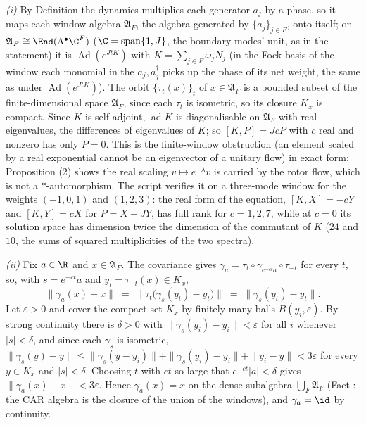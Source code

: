 \emph{(i)} By Definition  the dynamics multiplies each generator $a_{j}$ by a phase, so it maps each window algebra $\mathfrak{A}_{F}$, the algebra generated by $\{a_{j}\}_{j \in F}$, onto itself; on $\mathfrak{A}_{F} \cong \End(\Lambda^{\bullet}\C^{F})$ ($\C = \mathrm{span}\{1, J\}$, the boundary modes' unit, as in the statement) it is $\operatorname{Ad}(e^{JtK})$ with $K = \sum_{j \in F}\omega_{j}N_{j}$ (in the Fock basis of the window each monomial in the $a_{j}, a_{j}^{\dagger}$ picks up the phase of its net weight, the same as under $\operatorname{Ad}(e^{JtK})$). The orbit $\{\tau_{t}(x)\}_{t}$ of $x \in \mathfrak{A}_{F}$ is a bounded subset of the finite-dimensional space $\mathfrak{A}_{F}$, since each $\tau_{t}$ is isometric, so its closure $K_{x}$ is compact. Since $K$ is self-adjoint, $\operatorname{ad}K$ is diagonalisable on $\mathfrak{A}_{F}$ with real eigenvalues, the differences of eigenvalues of $K$; so $[K, P] = JcP$ with $c$ real and nonzero has only $P = 0$. This is the finite-window obstruction (an element scaled by a real exponential cannot be an eigenvector of a unitary flow) in exact form; Proposition (2) shows the real scaling $v \mapsto e^{-\lambda}v$ is carried by the rotor flow, which is not a $*$-automorphism. The script verifies it on a three-mode window for the weights $(-1, 0, 1)$ and $(1, 2, 3)$: the real form of the equation, $[K, X] = -cY$ and $[K, Y] = cX$ for $P = X + JY$, has full rank for $c = 1, 2, 7$, while at $c = 0$ its solution space has dimension twice the dimension of the commutant of $K$ ($24$ and $10$, the sums of squared multiplicities of the two spectra).

\emph{(ii)} Fix $a \in \R$ and $x \in \mathfrak{A}_{F}$. The covariance gives $\gamma_{a} = \tau_{t}\circ\gamma_{e^{-ct}a}\circ\tau_{-t}$ for every $t$, so, with $s = e^{-ct}a$ and $y_{t} = \tau_{-t}(x) \in K_{x}$,
\[
\|\gamma_{a}(x) - x\| \;=\; \bigl\|\tau_{t}\bigl(\gamma_{s}(y_{t}) - y_{t}\bigr)\bigr\| \;=\; \|\gamma_{s}(y_{t}) - y_{t}\| .
\]
Let $\varepsilon > 0$ and cover the compact set $K_{x}$ by finitely many balls $B(y_{i}, \varepsilon)$. By strong continuity there is $\delta > 0$ with $\|\gamma_{s}(y_{i}) - y_{i}\| < \varepsilon$ for all $i$ whenever $|s| < \delta$, and since each $\gamma_{s}$ is isometric, $\|\gamma_{s}(y) - y\| \le \|\gamma_{s}(y - y_{i})\| + \|\gamma_{s}(y_{i}) - y_{i}\| + \|y_{i} - y\| < 3\varepsilon$ for every $y \in K_{x}$ and $|s| < \delta$. Choosing $t$ with $ct$ so large that $e^{-ct}|a| < \delta$ gives $\|\gamma_{a}(x) - x\| < 3\varepsilon$. Hence $\gamma_{a}(x) = x$ on the dense subalgebra $\bigcup_{F}\mathfrak{A}_{F}$ (Fact : the CAR algebra is the closure of the union of the windows), and $\gamma_{a} = \id$ by continuity.

